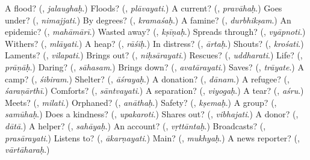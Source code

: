 \begin{tcolorbox}[breakable,colback=teal!4,colframe=teal!35!black,title={Before you move on}]
A flood? (\textbf{}, \emph{jalaughaḥ}.) Floods? (\textbf{}, \emph{plāvayati}.) A current? (\textbf{}, \emph{pravāhaḥ}.) Goes under? (\textbf{}, \emph{nimajjati}.) By degrees? (\textbf{}, \emph{kramaśaḥ}.) A famine? (\textbf{}, \emph{durbhikṣam}.) An epidemic? (\textbf{}, \emph{mahāmārī}.) Wasted away? (\textbf{}, \emph{kṣīṇaḥ}.) Spreads through? (\textbf{}, \emph{vyāpnoti}.) Withers? (\textbf{}, \emph{mlāyati}.) A heap? (\textbf{}, \emph{rāśiḥ}.) In distress? (\textbf{}, \emph{ārtaḥ}.) Shouts? (\textbf{}, \emph{krośati}.) Laments? (\textbf{}, \emph{vilapati}.) Brings out? (\textbf{}, \emph{niḥsārayati}.) Rescues? (\textbf{}, \emph{uddharati}.) Life? (\textbf{}, \emph{prāṇāḥ}.) Daring? (\textbf{}, \emph{sāhasam}.) Brings down? (\textbf{}, \emph{avatārayati}.) Saves? (\textbf{}, \emph{trāyate}.) A camp? (\textbf{}, \emph{śibiram}.) Shelter? (\textbf{}, \emph{āśrayaḥ}.) A donation? (\textbf{}, \emph{dānam}.) A refugee? (\textbf{}, \emph{śaraṇārthī}.) Comforts? (\textbf{}, \emph{sāntvayati}.) A separation? (\textbf{}, \emph{viyogaḥ}.) A tear? (\textbf{}, \emph{aśru}.) Meets? (\textbf{}, \emph{milati}.) Orphaned? (\textbf{}, \emph{anāthaḥ}.) Safety? (\textbf{}, \emph{kṣemaḥ}.) A group? (\textbf{}, \emph{samūhaḥ}.) Does a kindness? (\textbf{}, \emph{upakaroti}.) Shares out? (\textbf{}, \emph{vibhajati}.) A donor? (\textbf{}, \emph{dātā}.) A helper? (\textbf{}, \emph{sahāyaḥ}.) An account? (\textbf{}, \emph{vṛttāntaḥ}.) Broadcasts? (\textbf{}, \emph{prasārayati}.) Listens to? (\textbf{}, \emph{ākarṇayati}.) Main? (\textbf{}, \emph{mukhyaḥ}.) A news reporter? (\textbf{}, \emph{vārtāharaḥ}.)
\end{tcolorbox}
